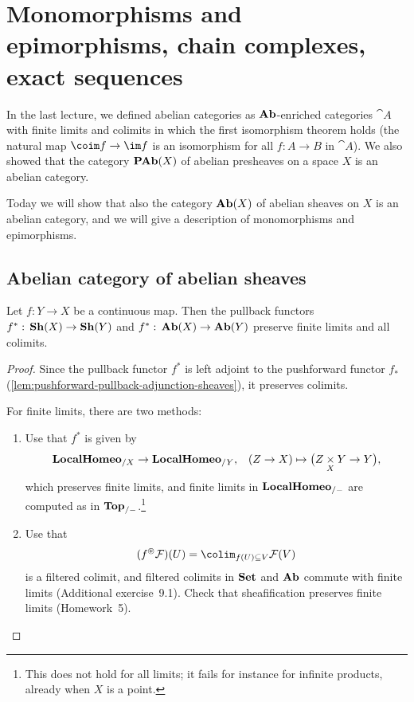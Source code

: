 \chapter{Monomorphisms and epimorphisms, chain complexes, exact sequences}\label{lecture:9}

In the last lecture, we defined abelian categories as \(\mathbf{Ab}\)-enriched categories \(\cat A\) with finite limits and colimits in which the first isomorphism theorem holds (the natural map \(\coim f\to\im f\) is an isomorphism for all \(f\colon A\to B\) in \(\cat A\)).
We also showed that the category \(\operatorname{\mathbf{PAb}}(X)\) of abelian presheaves on a space \(X\) is an abelian category.

Today we will show that also the category \(\operatorname{\mathbf{Ab}}(X)\) of abelian sheaves on \(X\) is an abelian category, and we will give a description of monomorphisms and epimorphisms.

\section{Abelian category of abelian sheaves}

\begin{lem}\label{lem:pullback-preserves-colimits-and-finite-limits}
Let \(f\colon Y\to X\) be a continuous map.
Then the pullback functors \(f^*\colon\catSheaf(X)\to\catSheaf(Y)\) and \(f^*\colon\catAbelianSheaf(X)\to\catAbelianSheaf(Y)\) preserve finite limits and all colimits.
\end{lem}
\begin{proof}
Since the pullback functor \(f^*\) is left adjoint to the pushforward functor \(f_*\) (\cref{lem:pushforward-pullback-adjunction-sheaves}), it preserves colimits.

For finite limits, there are two methods:
\begin{enumerate}
\item Use that \(f^*\) is given by
  \[\catLocalHomeomorphism_{/X}\to\catLocalHomeomorphism_{/Y}\text{,} \quad (Z\to X) \mapsto \bigl(Z\pullback{X}Y\to Y\bigr)\text{,} \]
  which preserves finite limits, and finite limits in \(\mathbf{LocalHomeo}_{/-}\) are computed as in \(\mathbf{Top}_{/-}\).\footnote{This does not hold for all limits; it fails for instance for infinite products, already when \(X\) is a point.}
\item Use that
  \[(f^\circledast\mathcal F)(U) = \colim_{f(U)\subseteq V}\mathcal F(V) \]
  is a filtered colimit, and filtered colimits in \(\mathbf{Set}\) and \(\mathbf{Ab}\) commute with finite limits (Additional exercise~9.1).
  Check that sheafification preserves finite limits (Homework~5).
  \qedhere
\end{enumerate}
\end{proof}

